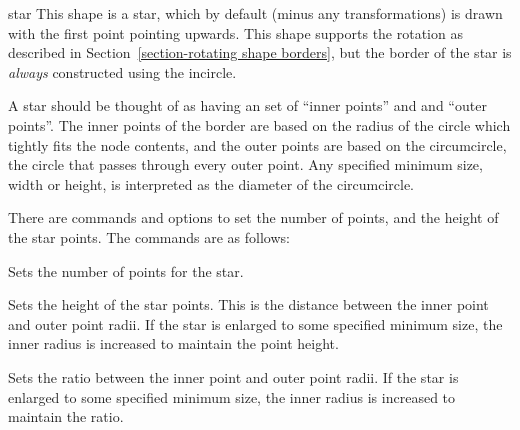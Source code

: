 \begin{shape}{star}
  This shape is a star, which by default (minus any transformations) is
  drawn with the first point pointing upwards.  
  This shape supports the rotation as described in 
  Section~\ref{section-rotating shape borders}, but the border of the 
  star is \emph{always} constructed using the incircle.
  
  A star should be thought of as having an set of ``inner points'' and
  and ``outer points''. 
  The inner points of the border are based on the radius of the circle
  which tightly fits the node contents, and the outer points are based
  on the circumcircle, the circle that passes through every outer
  point.
  Any specified minimum size, width or height, is interpreted as the 
  diameter of the circumcircle.
 
\begin{codeexample}[]
\end{codeexample} 
  
  There are \pgfname{} commands and \tikzname{} options to set the 
  number of points, and the height of the star points.
  The \pgfname{} commands are as follows:
  
  \begin{command}{\pgfsetstarpoints{}}
    Sets the number of points for the star.
  \end{command}
  
  \begin{command}{\pgfsetstarpointheight{}}
    Sets the height of the star points. This is the distance between the
    inner point and outer point radii. If the star is enlarged to some
    specified minimum size, the inner radius is increased to maintain
    the point height.	
  \end{command}
  
  \begin{command}{\pgfsetstarpointratio{}}
    Sets the ratio between the inner point and outer point radii.		
    If the star is enlarged to some specified minimum size, the
    inner radius is increased to maintain the ratio.	
  \end{command}
  

\end{shape}
